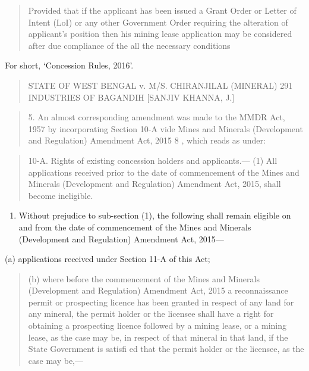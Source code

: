\documentclass[12pt,a4paper]{article}
\newenvironment{judgequote}
  {\begin{quote}\small}
  {\end{quote}}
\begin{document}
\begin{judgequote}
Provided that if the applicant has been issued a Grant Order or Letter
of Intent (LoI) or any other Government Order requiring the alteration
of applicant's position then his mining lease application may be
considered after due compliance of the all the necessary conditions
\end{judgequote}

 For short, `Concession Rules, 2016'.




\begin{judgequote}
STATE OF WEST BENGAL v. M/S. CHIRANJILAL (MINERAL) 291
INDUSTRIES OF BAGANDIH [SANJIV KHANNA, J.]
\end{judgequote}

\begin{judgequote}
5. An almost corresponding amendment was made to the MMDR Act,
1957 by incorporating Section 10-A vide Mines and Minerals (Development
and Regulation) Amendment Act, 2015 8 , which reads as under:
\end{judgequote}

\begin{judgequote}
10-A. Rights of existing concession holders and applicants.--- (1)
All applications received prior to the date of commencement of the
Mines and Minerals (Development and Regulation) Amendment Act,
2015, shall become ineligible.
\end{judgequote}

\begin{enumerate}[resume]
\item Without prejudice to sub-section (1), the following shall remain
eligible on and from the date of commencement of the Mines and
Minerals (Development and Regulation) Amendment Act, 2015---
\end{enumerate}

\noindent (a) applications received under Section 11-A of this Act;


\begin{judgequote}
(b) where before the commencement of the Mines and Minerals
(Development and Regulation) Amendment Act, 2015 a reconnaissance
permit or prospecting licence has been granted in respect of any land
for any mineral, the permit holder or the licensee shall have a right
for obtaining a prospecting licence followed by a mining lease, or a
mining lease, as the case may be, in respect of that mineral in that
land, if the State Government is satisfi ed that the permit holder or the
licensee, as the case may be,---
\end{judgequote}
\end{document}
